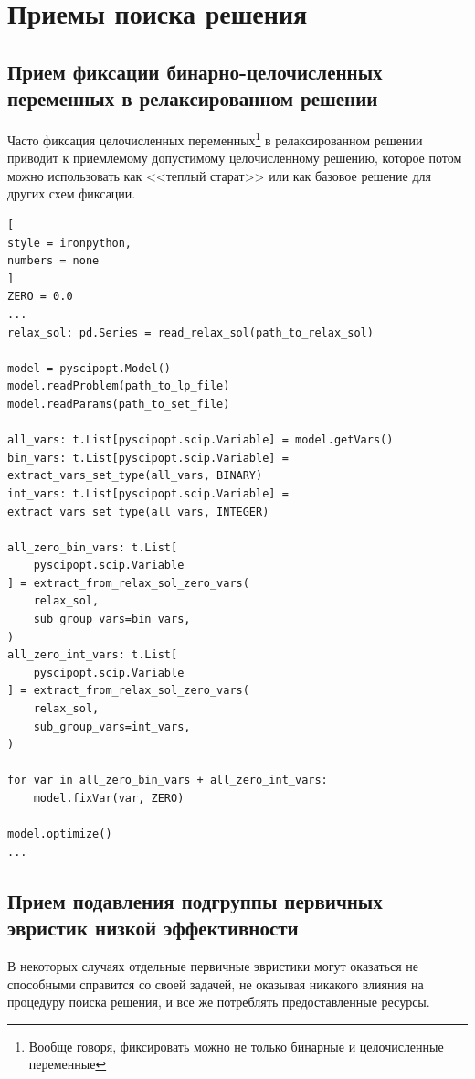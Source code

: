 \documentclass[%
	11pt,
	a4paper,
	utf8,
		]{article}
\begin{document}
\section{Приемы поиска решения}

\subsection{Прием фиксации бинарно-целочисленных переменных в релаксированном решении}\label{sec:bin_int_relax_fix}

Часто фиксация целочисленных переменных\footnote{Вообще говоря, фиксировать можно не только бинарные и целочисленные переменные} в релаксированном решении приводит к приемлемому допустимому целочисленному решению, которое потом можно использовать как <<теплый старат>> или как базовое решение для других схем фиксации.
\begin{lstlisting}[
style = ironpython,
numbers = none
]
ZERO = 0.0
...
relax_sol: pd.Series = read_relax_sol(path_to_relax_sol)

model = pyscipopt.Model()
model.readProblem(path_to_lp_file)
model.readParams(path_to_set_file)

all_vars: t.List[pyscipopt.scip.Variable] = model.getVars()
bin_vars: t.List[pyscipopt.scip.Variable] = extract_vars_set_type(all_vars, BINARY)
int_vars: t.List[pyscipopt.scip.Variable] = extract_vars_set_type(all_vars, INTEGER)

all_zero_bin_vars: t.List[
	pyscipopt.scip.Variable
] = extract_from_relax_sol_zero_vars(
	relax_sol,
	sub_group_vars=bin_vars,
)
all_zero_int_vars: t.List[
	pyscipopt.scip.Variable
] = extract_from_relax_sol_zero_vars(
	relax_sol,
	sub_group_vars=int_vars,
)

for var in all_zero_bin_vars + all_zero_int_vars:
	model.fixVar(var, ZERO)

model.optimize()
...
\end{lstlisting}


\subsection{Прием подавления подгруппы первичных эвристик низкой эффективности}\label{sec:suh}

В некоторых случаях отдельные первичные эвристики могут оказаться не способными справится со своей задачей, не оказывая никакого влияния на процедуру поиска решения, и все же потреблять предоставленные ресурсы.
\end{document}
